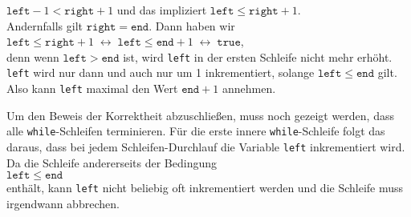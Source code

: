 \begin{enumerate}
      \hspace*{1.3cm} $\mathtt{left} - 1 < \mathtt{right} + 1$ \quad und das impliziert \quad $\mathtt{left} \leq \mathtt{right} + 1$. 
      \\[0.1cm]
      Andernfalls gilt $\texttt{right}=\mathtt{end}$.  Dann haben wir 
      \\[0.1cm]
      \hspace*{1.3cm}
      $\mathtt{left} \leq \mathtt{right} + 1 \;\leftrightarrow\;
       \mathtt{left} \leq \mathtt{end} + 1 \;\leftrightarrow\; \mathtt{true}$,
      \\[0.1cm]
      denn wenn $\texttt{left} > \mathtt{end}$ ist, wird \texttt{left} in der ersten
      Schleife nicht mehr erh\"oht.  \texttt{left} wird nur dann und auch nur um 1
      inkrementiert, solange $\texttt{left} \leq \mathtt{end}$ gilt.
      Also kann \texttt{left} maximal den Wert $\texttt{end} + 1$ annehmen.
\end{enumerate}
Um den Beweis der Korrektheit abzuschlie\ss{}en, muss noch gezeigt werden, dass 
alle \texttt{while}-Schleifen terminieren.  F\"ur die erste innere
\texttt{while}-Schleife folgt das daraus, dass bei jedem Schleifen-Durchlauf die Variable
\texttt{left} inkrementiert wird.  Da die Schleife andererseits der Bedingung \\[0.1cm]
\hspace*{1.3cm} $\texttt{left} \leq \mathtt{end}$ \\[0.1cm]
enth\"alt, kann \texttt{left} nicht beliebig oft inkrementiert werden und die Schleife muss
irgendwann abbrechen. 

